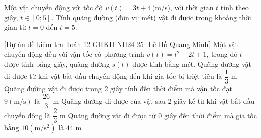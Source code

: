 \begin{bt}%
Một vật chuyển động với tốc độ $v(t)=3t+4$\,(m/s), với thời gian $t$ tính theo giây, $t\in[0;5]$. Tính quãng đường (đơn vị: mét) vật đi được trong khoảng thời gian từ $t=0$ đến $t=5$.
\par{}
\end{bt}

\begin{ex}%
[Dự án đề kiểm tra Toán 12 GHKII NH24-25- Lê Hồ Quang Minh]%
	Một vật chuyển động đều với vận tốc có phương trình $v(t)=t^2-2 t+1$, trong đó $t$ được tính bằng giây, quãng đường $s(t)$ được tính bằng mét.
	\choiceTF
	{\True Quãng đường vật đi được từ khi vật bắt đầu chuyển động đến khi gia tốc bị triệt tiêu là $\dfrac{1}{3}$ m}
	{Quãng đường vật đi được trong 2 giây tính đến thời điểm mà vận tốc đạt $9(\mathrm{m} / \mathrm{s})$ là $\dfrac{26}{3}$ m}
	{\True Quãng đường đi được của vật sau 2 giây kể từ khi vật bắt đầu chuyển động là $\dfrac{2}{3}$ m}
	{Quãng đường vật đi được từ 0 giây đến thời điểm mà gia tốc bằng $10(\mathrm{m} / \mathrm{s}^2)$ là $44$ m}
\end{ex}
